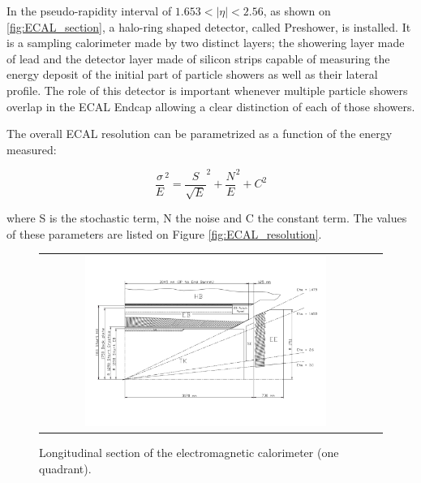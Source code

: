 In the pseudo-rapidity interval of $1.653 < |\eta| < 2.56$, as shown on \autoref{fig:ECAL_section}, a halo-ring shaped detector, called Preshower, is installed. It is a sampling calorimeter made by two distinct layers; the showering layer made of lead and the detector layer made of silicon strips capable of measuring the energy deposit of the initial part of particle showers as well as their lateral profile. The role of this detector is important whenever multiple particle showers overlap in the ECAL Endcap allowing a clear distinction of each of those showers.

The overall ECAL resolution can be parametrized as a function of the energy measured:

\begin{equation}
\dfrac{\sigma}{E}^{2} = \dfrac{S}{\sqrt{E}}^{2} + \dfrac{N}{E}^{2} + C^{2}
\end{equation}

where S is the stochastic term, N the noise and C the constant term. The values of these
parameters are listed on Figure \autoref{fig:ECAL_resolution}.  

\begin{figure}[tbh!]
	\centering
	\begin{tabular}{cc}
		\includegraphics[width=0.75\textwidth]{detector/pics/ECAL_section.pdf}
	\end{tabular}
	\caption{Longitudinal section of the electromagnetic calorimeter (one quadrant).}
	\label{fig:ECAL_section}
\end{figure}

